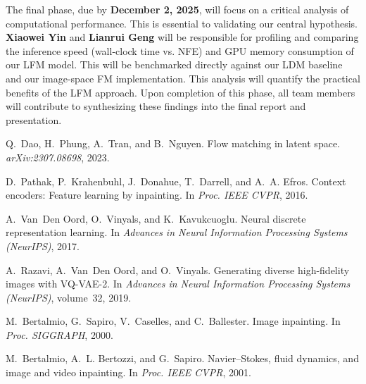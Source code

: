 \documentclass{article}
\begin{document}
The final phase, due by \textbf{December 2, 2025}, will focus on a critical analysis of computational performance. This is essential to validating our central hypothesis. \textbf{Xiaowei Yin} and \textbf{Lianrui Geng} will be responsible for profiling and comparing the inference speed (wall-clock time vs. NFE) and GPU memory consumption of our LFM model. This will be benchmarked directly against our LDM baseline and our image-space FM implementation. This analysis will quantify the practical benefits of the LFM approach. Upon completion of this phase, all team members will contribute to synthesizing these findings into the final report and presentation.

\small

\begin{thebibliography}{9}


Q.~Dao, H.~Phung, A.~Tran, and B.~Nguyen.
\newblock Flow matching in latent space.
\newblock \emph{arXiv:2307.08698}, 2023.

D.~Pathak, P.~Krahenbuhl, J.~Donahue, T.~Darrell, and A.~A. Efros.
\newblock Context encoders: Feature learning by inpainting.
\newblock In \emph{Proc. IEEE CVPR}, 2016.

A.~Van~Den Oord, O.~Vinyals, and K.~Kavukcuoglu.
\newblock Neural discrete representation learning.
\newblock In \emph{Advances in Neural Information Processing Systems (NeurIPS)}, 2017.

A.~Razavi, A.~Van~Den Oord, and O.~Vinyals.
\newblock Generating diverse high-fidelity images with {VQ-VAE-2}.
\newblock In \emph{Advances in Neural Information Processing Systems (NeurIPS)}, volume~32, 2019.

M.~Bertalmio, G.~Sapiro, V.~Caselles, and C.~Ballester.
\newblock Image inpainting.
\newblock In \emph{Proc. SIGGRAPH}, 2000.

M.~Bertalmio, A.~L. Bertozzi, and G.~Sapiro.
\newblock Navier--Stokes, fluid dynamics, and image and video inpainting.
\newblock In \emph{Proc. IEEE CVPR}, 2001.


\end{thebibliography}
\end{document}

